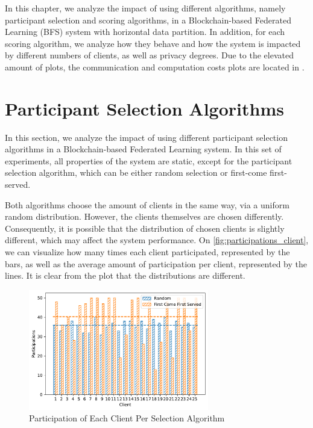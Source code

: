 In this chapter, we analyze the impact of using different algorithms, namely participant selection and scoring algorithms, in a Blockchain-based Federated Learning (BFS) system with horizontal data partition. In addition, for each scoring algorithm, we analyze how they behave and how the system is impacted by different numbers of clients, as well as privacy degrees. Due to the elevated amount of plots, the communication and computation costs plots are located in .

\section{Participant Selection Algorithms}

In this section, we analyze the impact of using different participant selection algorithms in a Blockchain-based Federated Learning system. In this set of experiments, all properties of the system are static, except for the participant selection algorithm, which can be either random selection or first-come first-served.

Both algorithms choose the amount of clients in the same way, via a uniform random distribution. However, the clients themselves are chosen differently. Consequently, it is possible that the distribution of chosen clients is slightly different, which may affect the system performance. On \autoref{fig:participations_client}, we can visualize how many times each client participated, represented by the bars, as well as the average amount of participation per client, represented by the lines. It is clear from the plot that the distributions are different.

\begin{figure}[!ht]
    \centering
    \centering
    \includegraphics[width=0.7\textwidth]{graphics/selection/clients.pdf}
    \caption{Participation of Each Client Per Selection Algorithm}
    \label{fig:participations_client}
\end{figure}

